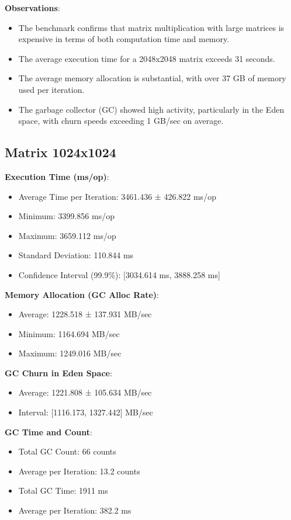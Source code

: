 \documentclass{article}
\begin{document}
\textbf{Observations}:
\begin{itemize}
    \item The benchmark confirms that matrix multiplication with large matrices is expensive in terms of both computation time and memory.
    \item The average execution time for a 2048x2048 matrix exceeds 31 seconds.
    \item The average memory allocation is substantial, with over 37 GB of memory used per iteration.
    \item The garbage collector (GC) showed high activity, particularly in the Eden space, with churn speeds exceeding 1 GB/sec on average.
\end{itemize}

\subsection{Matrix 1024x1024}
\textbf{Execution Time (ms/op)}:
\begin{itemize}
    \item Average Time per Iteration: 3461.436 ± 426.822 ms/op
    \item Minimum: 3399.856 ms/op
    \item Maximum: 3659.112 ms/op
    \item Standard Deviation: 110.844 ms
    \item Confidence Interval (99.9\%): [3034.614 ms, 3888.258 ms]
\end{itemize}

\textbf{Memory Allocation (GC Alloc Rate)}:
\begin{itemize}
    \item Average: 1228.518 ± 137.931 MB/sec
    \item Minimum: 1164.694 MB/sec
    \item Maximum: 1249.016 MB/sec
\end{itemize}

\textbf{GC Churn in Eden Space}:
\begin{itemize}
    \item Average: 1221.808 ± 105.634 MB/sec
    \item Interval: [1116.173, 1327.442] MB/sec
\end{itemize}

\textbf{GC Time and Count}:
\begin{itemize}
    \item Total GC Count: 66 counts
    \item Average per Iteration: 13.2 counts
    \item Total GC Time: 1911 ms
    \item Average per Iteration: 382.2 ms
\end{itemize}
\end{document}
